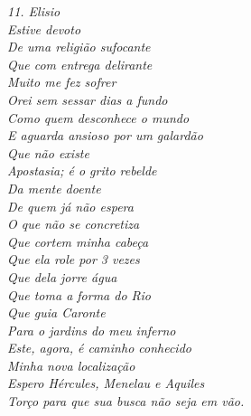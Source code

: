 \clearpage
\thispagestyle{empty}

\vspace*{\fill}

\begin{flushright}
    \itshape
    11. Elisio \\[0.5cm]

    Estive devoto \\
    De uma religião sufocante \\
    Que com entrega delirante \\
    Muito me fez sofrer \\[\baselineskip]
    Orei sem sessar dias a fundo \\
    Como quem desconhece o mundo \\
    E aguarda ansioso por um galardão \\
    Que não existe \\[\baselineskip]
    Apostasia; é o grito rebelde \\
    Da mente doente \\
    De quem já não espera \\
    O que não se concretiza \\[\baselineskip]
    Que cortem minha cabeça \\
    Que ela role por 3 vezes \\
    Que dela jorre água \\
    Que toma a forma do Rio \\
    Que guia Caronte \\
    Para o jardins do meu inferno \\[\baselineskip]
    Este, agora, é caminho conhecido \\
    Minha nova localização \\
    Espero Hércules, Menelau e Aquiles \\
    Torço para que sua busca não seja em vão.
\end{flushright}

\clearpage
